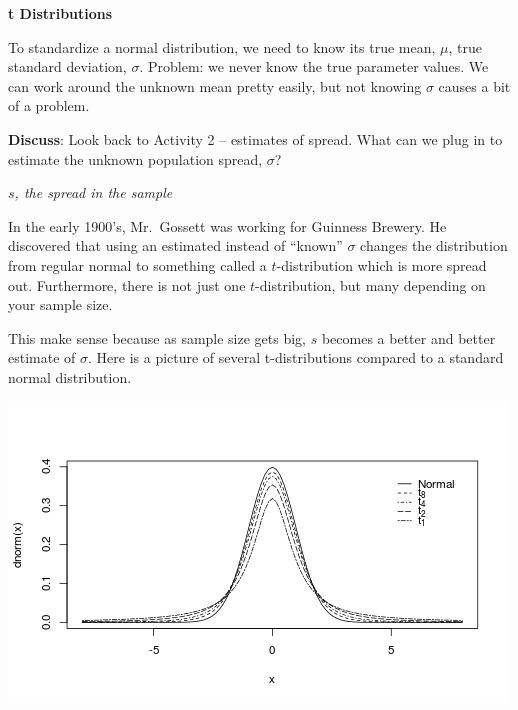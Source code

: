 \begin{center}
  {\Large\bf t Distributions}
\end{center}

To standardize a normal distribution,  we need to know its true mean,
$\mu$, true standard deviation, $\sigma$. Problem: we never know the
true parameter values.  We can work around the unknown
mean pretty easily, but not knowing $\sigma$ causes a bit of a problem.

{\bf Discuss}: Look back to Activity 2 -- estimates of spread. What
can we plug in to estimate the unknown population spread, $\sigma$? 
\begin{students}
        \vspace{2cm}        
\end{students}

\begin{key}
 {\it $s$, the spread in the sample}
\end{key}

In the early 1900's, Mr.~Gossett was working for Guinness Brewery.  He
discovered that using an estimated instead of ``known'' $\sigma$
changes the distribution from regular normal to something called a
$t$-distribution which is more spread out.  Furthermore, there is not
just one $t$-distribution, but many depending on your sample size.

This make sense because as sample size gets big, $s$ becomes a better
and better estimate of $\sigma$.  Here is a picture of several
t-distributions compared to a standard normal distribution.  

\includegraphics[width=.7\linewidth]{plots/t-normalDensities.png}

